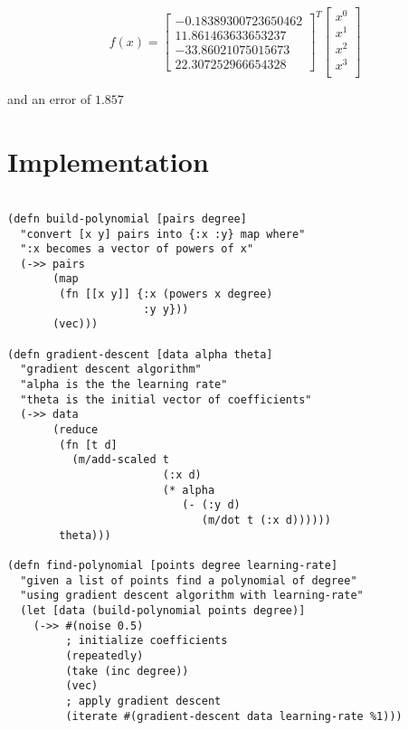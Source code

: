 \documentclass[parskip=half,a4paper]{scrartcl}
\begin{document}
$$
f(x) = \begin{bmatrix}
-0.18389300723650462\\
11.861463633653237\\
-33.86021075015673\\
22.307252966654328
\end{bmatrix}^T
\begin{bmatrix}
x^0 \\
x^1 \\
x^2 \\
x^3 \\
\end{bmatrix}
$$

and an error of $1.857$

\pagebreak

\section*{Implementation}

\begin{verbatim}

(defn build-polynomial [pairs degree]
  "convert [x y] pairs into {:x :y} map where"
  ":x becomes a vector of powers of x"
  (->> pairs
       (map
        (fn [[x y]] {:x (powers x degree)
                     :y y}))
       (vec)))

(defn gradient-descent [data alpha theta]
  "gradient descent algorithm"
  "alpha is the the learning rate"
  "theta is the initial vector of coefficients"
  (->> data
       (reduce
        (fn [t d]
          (m/add-scaled t
                        (:x d)
                        (* alpha
                           (- (:y d)
                              (m/dot t (:x d))))))
        theta)))

(defn find-polynomial [points degree learning-rate]
  "given a list of points find a polynomial of degree"
  "using gradient descent algorithm with learning-rate"
  (let [data (build-polynomial points degree)]
    (->> #(noise 0.5)
         ; initialize coefficients
         (repeatedly)
         (take (inc degree))
         (vec)
         ; apply gradient descent
         (iterate #(gradient-descent data learning-rate %1)))
\end{verbatim}
\end{document}

